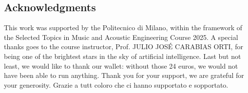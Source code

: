 \documentclass{article}
\begin{document}
\begin{sloppy}
\section{Acknowledgments}
\label{sec:ack}


This work was supported by the Politecnico di Milano,
within the framework of the Selected Topics in Music and Acoustic Engineering Course 2025.
A special thanks goes to the course instructor, Prof. JULIO JOSÉ CARABIAS ORTI, for being
one of the brightest stars in the sky of artificial intelligence.
Last but not least, we would like to thank our wallet: without those 24 euros, we would not have been able to run anything.
Thank you for your support, we are grateful for your generosity.
Grazie a tutt coloro che ci hanno supportato e sopportato.



\end{sloppy}
\end{document}
